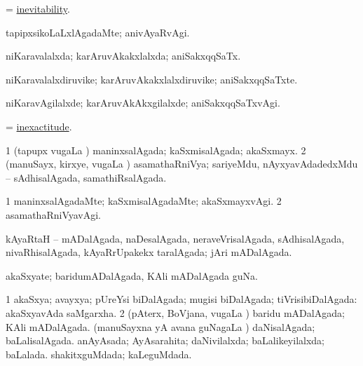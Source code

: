 \bentry
{}
\gl{\nA}
\bmng
 = \hyperlink{inevitability}{inevitability}. 
\emng
\eentry

\bentry
{}
\gl{\kirxvi}
\bmng
tapipxsikoLaLxlAgadaMte; anivAyaRvAgi. 
\emng
\eentry

\bentry
{}
\gl{\gu}
\bmng
niKaravalalxda; karAruvAkakxlalxda; aniSakxqqSaTx. 
\emng
\eentry

\bentry
{}
\gl{\nA}
\bmng
niKaravalalxdiruvike; karAruvAkakxlalxdiruvike; aniSakxqqSaTxte. 
\emng
\eentry

\bentry
{}
\gl{\kirxvi}
\bmng
niKaravAgilalxde; karAruvAkAkxgilalxde; aniSakxqqSaTxvAgi. 
\emng
\eentry

\bentry
{}
\gl{\nA}
\bmng
 = \hyperlink{inexactitude}{inexactitude}. 
\emng
\eentry

\bentry
{}
\gl{\gu}
\bmng
\bnum
\num{1} (tapupx \mo vugaLa \vi) maninxsalAgada; kaSxmisalAgada; akaSxmayx. 
\num{2} (manuSayx, kirxye, \mo vugaLa \vi) asamathaRniVya; sariyeMdu, nAyxyavAdadedxMdu -- sAdhisalAgada, samathiRsalAgada. 
\enum
\emng
\eentry

\bentry
{}
\gl{\kirxvi}
\bmng
\bnum
\num{1} maninxsalAgadaMte; kaSxmisalAgadaMte; akaSxmayxvAgi. 
\num{2} asamathaRniVyavAgi. 
\enum
\emng
\eentry

\bentry
{}
\gl{\gu}
\bmng
kAyaRtaH -- mADalAgada, naDesalAgada, neraveVrisalAgada, sAdhisalAgada, nivaRhisalAgada, kAyaRrUpakekx taralAgada; jAri mADalAgada. 
\emng
\eentry

\bentry
{}
\gl{\nA}
\bmng
akaSxyate; baridumADalAgada, KAli mADalAgada guNa. 
\emng
\eentry

\bentry
{}
\gl{\gu}
\bmng
\bnum
\num{1} akaSxya; avayxya; pUreYsi biDalAgada; mugisi biDalAgada; tiVrisibiDalAgada:  akaSxyavAda saMgarxha. 
\num{2} (pAterx, BoVjana, \mo vugaLa \vi) baridu mADalAgada; KAli mADalAgada. 
 (manuSayxna yA avana guNagaLa \vi) 
\banum
{} daNisalAgada; baLalisalAgada. 
 anAyAsada; AyAsarahita; daNivilalxda; baLalikeyilalxda; baLalada. 
 shakitxguMdada; kaLeguMdada. 
\eanum
\numie
\enum
\emng
\eentry

